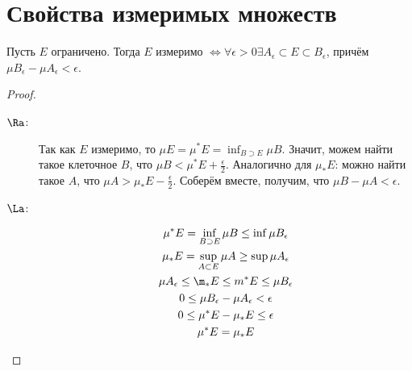 \section{Свойства измеримых множеств}
\begin{theorem}
	Пусть $E$ ограничено.
	Тогда $E$ измеримо $\iff \forall \epsilon > 0 \exists A_\epsilon \subset E \subset B_\epsilon$, причём
	$\mu B_\epsilon - \mu A_\epsilon < \epsilon$.
\end{theorem}
\begin{proof}
	\begin{description}
	\item[$\Ra$:]
		Так как $E$ измеримо, то $\mu E = \mu^* E = \inf_{B \supset E} \mu B$.
		Значит, можем найти такое клеточное $B$, что $\mu B < \mu^*E + \frac{\epsilon}2$.
		Аналогично для $\mu_* E$: можно найти такое $A$, что $\mu A > \mu_*E - \frac{\epsilon}2$.
		Соберём вместе, получим, что $\mu B - \mu A < \epsilon$.
	\item[$\La$:]
		\begin{gather*}
			\mu^*E = \inf_{B\supset E} \mu B \le \inf \mu B_\epsilon \\
			\mu_*E = \sup_{A\subset E} \mu A \ge \sup \mu A_\epsilon \\
			\mu A_\epsilon \le \m_*E \le m^* E \le \mu B_\epsilon \\
			0 \le \mu B_\epsilon - \mu A_\epsilon < \epsilon \\
			0 \le \mu^* E - \mu_* E \le \epsilon \\
			\mu^* E = \mu_* E \\
		\end{gather*}
	\end{description}
\end{proof}
